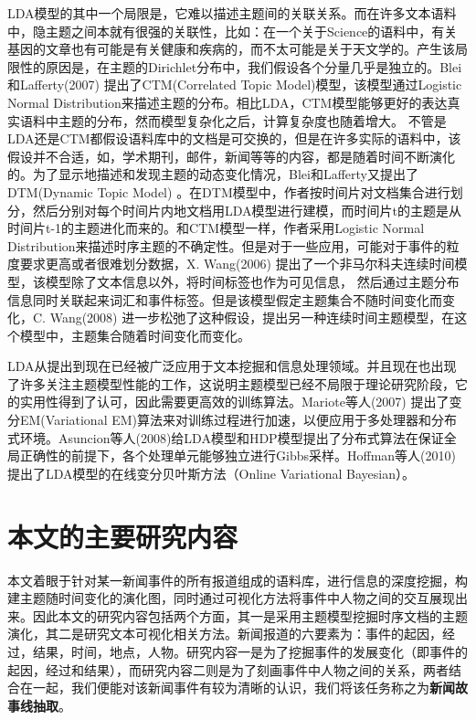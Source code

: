 LDA模型的其中一个局限是，它难以描述主题间的关联关系。而在许多文本语料中，隐主题之间本就有很强的关联性，比如：在一个关于Science的语料中，有关基因的文章也有可能是有关健康和疾病的，而不太可能是关于天文学的。产生该局限性的原因是，在主题的Dirichlet分布中，我们假设各个分量几乎是独立的。Blei和Lafferty(2007) \cite{lafferty2005correlated} 提出了CTM(Correlated Topic Model)模型，该模型通过Logistic Normal Distribution来描述主题的分布。相比LDA，CTM模型能够更好的表达真实语料中主题的分布，然而模型复杂化之后，计算复杂度也随着增大。
不管是LDA还是CTM都假设语料库中的文档是可交换的，但是在许多实际的语料中，该假设并不合适，如，学术期刊，邮件，新闻等等的内容，都是随着时间不断演化的。为了显示地描述和发现主题的动态变化情况，Blei和Lafferty又提出了DTM(Dynamic Topic Model) \cite{Blei:2006} 。在DTM模型中，作者按时间片对文档集合进行划分，然后分别对每个时间片内地文档用LDA模型进行建模，而时间片t的主题是从时间片t-1的主题进化而来的。和CTM模型一样，作者采用Logistic Normal Distribution来描述时序主题的不确定性。但是对于一些应用，可能对于事件的粒度要求更高或者很难划分数据，X. Wang(2006) \cite{wang2006topics} 提出了一个非马尔科夫连续时间模型，该模型除了文本信息以外，将时间标签也作为可见信息，
然后通过主题分布信息同时关联起来词汇和事件标签。但是该模型假定主题集合不随时间变化而变化，C. Wang(2008) \cite{wang2008continuous} 进一步松弛了这种假设，提出另一种连续时间主题模型，在这个模型中，主题集合随着时间变化而变化。


LDA从提出到现在已经被广泛应用于文本挖掘和信息处理领域。并且现在也出现了许多关注主题模型性能的工作，这说明主题模型已经不局限于理论研究阶段，它的实用性得到了认可，因此需要更高效的训练算法。Mariote等人(2007)\cite{mariote2007parallelized} 提出了变分EM(Variational EM)算法来对训练过程进行加速，以便应用于多处理器和分布式环境。Asuncion等人(2008)给LDA模型和HDP模型提出了分布式算法在保证全局正确性的前提下，各个处理单元能够独立进行Gibbs采样。Hoffman等人(2010) \cite{hoffman2010online} 提出了LDA模型的在线变分贝叶斯方法（Online Variational Bayesian）。

\section{本文的主要研究内容}
本文着眼于针对某一新闻事件的所有报道组成的语料库，进行信息的深度挖掘，构建主题随时间变化的演化图，同时通过可视化方法将事件中人物之间的交互展现出来。因此本文的研究内容包括两个方面，其一是采用主题模型挖掘时序文档的主题演化，其二是研究文本可视化相关方法。新闻报道的六要素为：事件的起因，经过，结果，时间，地点，人物。研究内容一是为了挖掘事件的发展变化（即事件的起因，经过和结果），而研究内容二则是为了刻画事件中人物之间的关系，两者结合在一起，我们便能对该新闻事件有较为清晰的认识，我们将该任务称之为\textbf{新闻故事线抽取}。



